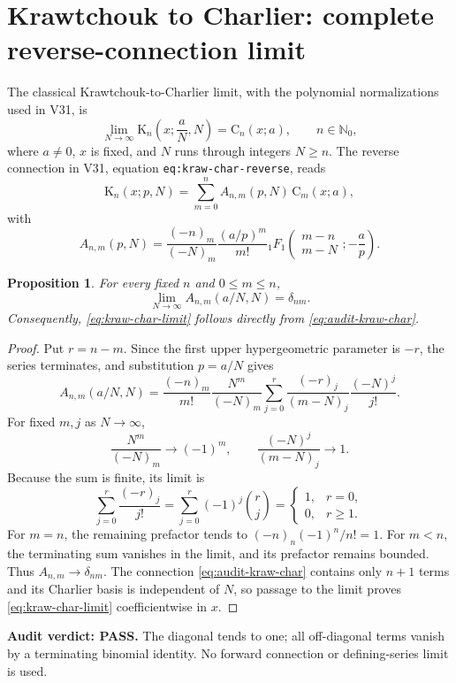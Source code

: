 \documentclass[11pt]{article}
\newtheorem{proposition}{Proposition}
\begin{document}
\section{Krawtchouk to Charlier: complete reverse-connection limit}
The classical Krawtchouk-to-Charlier limit, with the polynomial
normalizations used in V31, is
\begin{equation}\label{eq:kraw-char-limit}
 \lim_{N\to\infty}\mathrm K_n\!\left(x;\frac aN,N\right)
 =\mathrm C_n(x;a),\qquad n\in\mathbb N_0,
\end{equation}
where $a\ne0$, $x$ is fixed, and $N$ runs through integers $N\ge n$.
The reverse connection in V31, equation \texttt{eq:kraw-char-reverse}, reads
\begin{equation}\label{eq:audit-kraw-char}
\mathrm K_n(x;p,N)=\sum_{m=0}^n A_{n,m}(p,N)\,\mathrm C_m(x;a),
\end{equation}
with
\[
 A_{n,m}(p,N)=\frac{(-n)_m}{(-N)_m}\frac{(a/p)^m}{m!}
 {}_1F_1\!\left(\begin{matrix}m-n\\m-N\end{matrix};-\frac ap\right).
\]
\begin{proposition}
For every fixed $n$ and $0\le m\le n$,
\[
 \lim_{N\to\infty} A_{n,m}(a/N,N)=\delta_{nm}.
\]
Consequently, \eqref{eq:kraw-char-limit} follows directly from
\eqref{eq:audit-kraw-char}.
\end{proposition}
\begin{proof}
Put $r=n-m$. Since the first upper hypergeometric parameter is
$-r$, the series terminates, and substitution $p=a/N$ gives
\[
 A_{n,m}(a/N,N)=
 \frac{(-n)_m}{m!}\frac{N^m}{(-N)_m}
 \sum_{j=0}^{r}\frac{(-r)_j}{(m-N)_j}\frac{(-N)^j}{j!}.
\]
For fixed $m,j$ as $N\to\infty$,
\[
 \frac{N^m}{(-N)_m}\longrightarrow(-1)^m,
 \qquad \frac{(-N)^j}{(m-N)_j}\longrightarrow1.
\]
Because the sum is finite, its limit is
\[
 \sum_{j=0}^{r}\frac{(-r)_j}{j!}
 =\sum_{j=0}^{r}(-1)^j\binom rj
 =\begin{cases}1,&r=0,\\0,&r\ge1.\end{cases}
\]
For $m=n$, the remaining prefactor tends to
$(-n)_n(-1)^n/n!=1$. For $m<n$, the terminating sum
vanishes in the limit, and its prefactor remains bounded.
Thus $A_{n,m}\to\delta_{nm}$. The connection
\eqref{eq:audit-kraw-char} contains only $n+1$ terms and its
Charlier basis is independent of $N$, so passage to the limit
proves \eqref{eq:kraw-char-limit} coefficientwise in $x$.
\end{proof}
\noindent\textbf{Audit verdict: PASS.} The diagonal tends to one;
all off-diagonal terms vanish by a terminating binomial identity.
No forward connection or defining-series limit is used.
\end{document}
